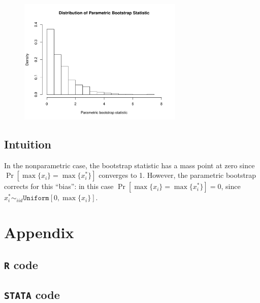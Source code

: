 \documentclass[12pt]{article}
\begin{document}
\begin{figure}[!htpb]
    \centering
    
        \includegraphics[width=0.7\textwidth]{freq2.pdf}

\end{figure}

\subsection{Intuition} In the nonparametric case, the bootstrap statistic has a mass point at zero since $\Pr[\max\{x_i\} = \max\{x_i^*\}]$ converges to 1. However, the parametric bootstrap corrects for this ``bias'': in this case $\Pr[\max\{x_i\} = \max\{x_i^*\}] = 0$, since $x_i^* \sim_{iid} \texttt{Uniform}[0,\max\{x_i\}].$

\newpage

\section{Appendix}

\subsection{\texttt{R} code}
\subsection{\texttt{STATA} code}
\end{document}
